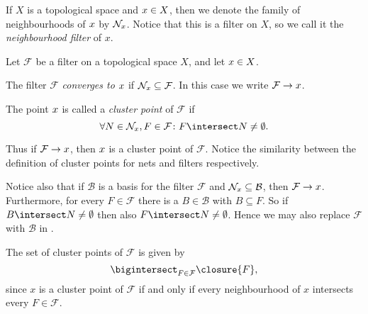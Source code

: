 \documentclass[article, a4paper, 11pt, oneside]{memoir}
\numberwithin{equation}{chapter}
\newcommand{\calB}{\mathcal{B}}
\newcommand{\calF}{\mathcal{F}}
\theoremstyle{nonumberplain}
\begin{document}
If $X$ is a topological space and $x \in X$, then we denote the family of neighbourhoods of $x$ by $\mathcal{N}_{x}$. Notice that this is a filter on $X$, so we call it the \emph{neighbourhood filter} of $x$.

\begin{definition}
    Let $\calF$ be a filter on a topological space $X$, and let $x \in X$.
    \begin{enumdef}
        \item The filter $\calF$ \emph{converges to $x$} if $\nhoods{\mylimit} \subseteq \calF$. In this case we write $\calF \to \mylimit$.
        
        \item \label{enum:filter-cluster} The point $x$ is called a \emph{cluster point} of $\calF$ if
        \begin{equation*}
            \forall N \in \nhoods{\mylimit}, F \in \calF \colon F \intersect N \neq \emptyset.
        \end{equation*}
    \end{enumdef}
\end{definition}
%
Thus if $\calF \to \mylimit$, then $x$ is a cluster point of $\calF$. Notice the similarity between the definition of cluster points for nets and filters respectively.

\begin{remarkbreak}
    \begin{enumrem}
        \item \label{enum:filter-cluster-points} Notice also that if $\calB$ is a basis for the filter $\calF$ and $\nhoods{\mylimit} \subseteq \calB$, then $\calF \to \mylimit$. Furthermore, for every $F \in \calF$ there is a $B \in \calB$ with $B \subseteq F$. So if $B \intersect N \neq \emptyset$ then also $F \intersect N \neq \emptyset$. Hence we may also replace $\calF$ with $\calB$ in .
        
        \item \label{enum:filter-cluster-equivalent} The set of cluster points of $\calF$ is given by
        \begin{equation*}
            \bigintersect_{F \in \calF} \closure{F},
        \end{equation*}
        since $x$ is a cluster point of $\calF$ if and only if every neighbourhood of $x$ intersects every $F \in \calF$.
    \end{enumrem}
\end{remarkbreak}
\end{document}
